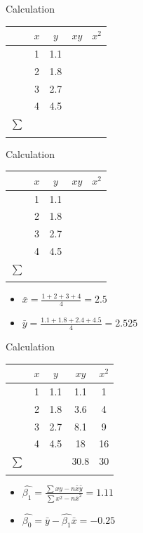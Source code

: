 \documentclass[
  ignorenonframetext,
]{beamer}
\providecommand{\tightlist}{%
  \setlength{\itemsep}{0pt}\setlength{\parskip}{0pt}}\usepackage{longtable,booktabs,array}
\begin{document}
\begin{frame}{Calculation}
\protect\hypertarget{calculation-1}{}
\begin{longtable}[]{@{}ccccc@{}}
\toprule\noalign{}
& \(x\) & \(y\) & \(xy\) & \(x^2\) \\
\midrule\noalign{}
\endhead
& 1 & 1.1 & & \\
& 2 & 1.8 & & \\
& 3 & 2.7 & & \\
& 4 & 4.5 & & \\
\(\sum\) & & & & \\
\bottomrule\noalign{}
\end{longtable}
\end{frame}

\begin{frame}{Calculation}
\protect\hypertarget{calculation-2}{}
\begin{longtable}[]{@{}ccccc@{}}
\toprule\noalign{}
& \(x\) & \(y\) & \(xy\) & \(x^2\) \\
\midrule\noalign{}
\endhead
& 1 & 1.1 & & \\
& 2 & 1.8 & & \\
& 3 & 2.7 & & \\
& 4 & 4.5 & & \\
\(\sum\) & & & & \\
\bottomrule\noalign{}
\end{longtable}

\begin{itemize}
\tightlist
\item
  \(\bar{x} = \frac{1+2+3+4}{4} = 2.5\)
\item
  \(\bar{y} = \frac{1.1+1.8+2.4+4.5}{4} = 2.525\)
\end{itemize}
\end{frame}

\begin{frame}{Calculation}
\protect\hypertarget{calculation-3}{}
\begin{longtable}[]{@{}ccccc@{}}
\toprule\noalign{}
& \(x\) & \(y\) & \(xy\) & \(x^2\) \\
\midrule\noalign{}
\endhead
& 1 & 1.1 & 1.1 & 1 \\
& 2 & 1.8 & 3.6 & 4 \\
& 3 & 2.7 & 8.1 & 9 \\
& 4 & 4.5 & 18 & 16 \\
\(\sum\) & & & 30.8 & 30 \\
\bottomrule\noalign{}
\end{longtable}

\begin{itemize}
\item
  \(\hat{\beta_1} = \frac{\sum xy -n\bar{x}\bar{y}}{\sum x^2 - n\bar{x}^2} = 1.11\)
\item
  \(\hat{\beta_0} = \bar{y} - \hat{\beta_{1}}\bar{x} = -0.25\)
\end{itemize}
\end{frame}
\end{document}
